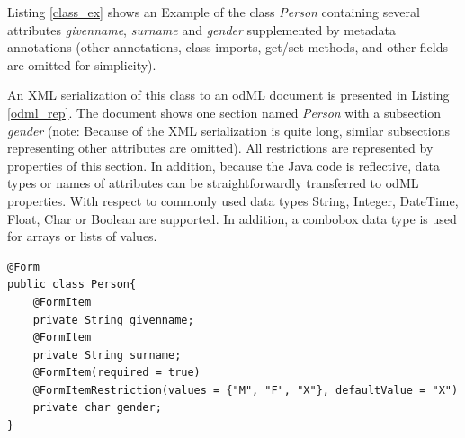 \documentclass[a4paper,twoside]{article}
\begin{document}
Listing \ref{class_ex} shows an Example of the class \textit{Person} containing several attributes \textit{givenname}, \textit{surname} and \textit{gender} supplemented by metadata annotations (other annotations, class imports, get/set methods, and other fields are omitted for simplicity).

An XML serialization of this class to an odML document is presented in Listing \ref{odml_rep}. The document shows one section named \textit{Person} with a subsection \textit{gender} (note: Because of the XML serialization is quite long, similar subsections representing other attributes are omitted). All restrictions are represented by properties of this section. In addition, because the Java code is reflective, data types or names of attributes can be straightforwardly transferred to odML properties. With respect to commonly used data types String, Integer, DateTime, Float, Char or Boolean are supported. In addition, a combobox data type is used for arrays or lists of values.


\scriptsize
\begin{lstlisting}[label=class_ex,caption=Java Class Example]
@Form
public class Person{
	@FormItem
	private String givenname;
	@FormItem
	private String surname;
	@FormItem(required = true)
	@FormItemRestriction(values = {"M", "F", "X"}, defaultValue = "X")
	private char gender;
}
\end{lstlisting}
\normalsize
\end{document}
